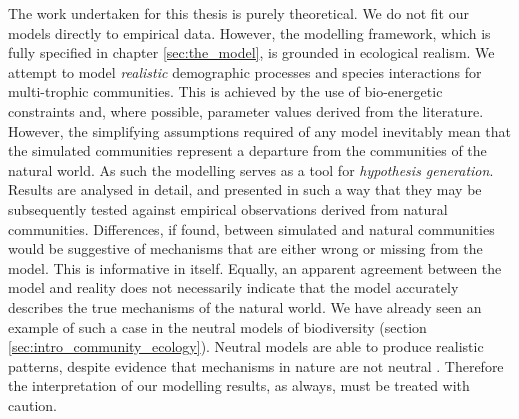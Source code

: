 The work undertaken for this thesis is purely theoretical. We do not fit our models directly to empirical data. However, the modelling framework, which is fully specified in chapter \ref{sec:the_model}, is grounded in ecological realism. We attempt to model \emph{realistic} demographic processes and species interactions for multi-trophic communities. This is achieved by the use of bio-energetic constraints and, where possible, parameter values derived from the literature. However, the simplifying assumptions required of any model inevitably mean that the simulated communities represent a departure from the communities of the natural world. As such the modelling serves as a tool for \emph{hypothesis generation}. Results are analysed in detail, and presented in such a way that they may be subsequently tested against empirical observations derived from natural communities. Differences, if found, between simulated and natural communities would be suggestive of mechanisms that are either wrong or missing from the model. This is informative in itself. Equally, an apparent agreement between the model and reality does not necessarily indicate that the model accurately describes the true mechanisms of the natural world. We have already seen an example of such a case in the neutral models of biodiversity (section \ref{sec:intro_community_ecology}). Neutral models are able to produce realistic patterns, despite evidence that mechanisms in nature are not neutral \cite{purves2005ecological}. Therefore the interpretation of our modelling results, as always, must be treated with caution.

